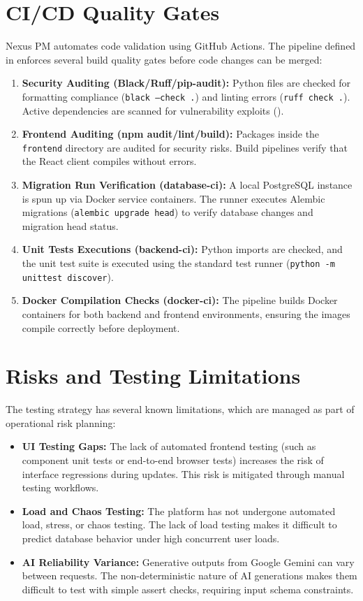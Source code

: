 \section{CI/CD Quality Gates}
Nexus PM automates code validation using GitHub Actions. The pipeline defined in  enforces several build quality gates before code changes can be merged:
\begin{enumerate}
    \item \textbf{Security Auditing (Black/Ruff/pip-audit):} Python files are checked for formatting compliance (\texttt{black --check .}) and linting errors (\texttt{ruff check .}). Active dependencies are scanned for vulnerability exploits ().
    \item \textbf{Frontend Auditing (npm audit/lint/build):} Packages inside the \texttt{frontend} directory are audited for security risks. Build pipelines verify that the React client compiles without errors.
    \item \textbf{Migration Run Verification (database-ci):} A local PostgreSQL instance is spun up via Docker service containers. The runner executes Alembic migrations (\texttt{alembic upgrade head}) to verify database changes and migration head status.
    \item \textbf{Unit Tests Executions (backend-ci):} Python imports are checked, and the unit test suite is executed using the standard test runner (\texttt{python -m unittest discover}).
    \item \textbf{Docker Compilation Checks (docker-ci):} The pipeline builds Docker containers for both backend and frontend environments, ensuring the images compile correctly before deployment.
\end{enumerate}

\section{Risks and Testing Limitations}
The testing strategy has several known limitations, which are managed as part of operational risk planning:
\begin{itemize}
    \item \textbf{UI Testing Gaps:} The lack of automated frontend testing (such as component unit tests or end-to-end browser tests) increases the risk of interface regressions during updates. This risk is mitigated through manual testing workflows.
    \item \textbf{Load and Chaos Testing:} The platform has not undergone automated load, stress, or chaos testing. The lack of load testing makes it difficult to predict database behavior under high concurrent user loads.
    \item \textbf{AI Reliability Variance:} Generative outputs from Google Gemini can vary between requests. The non-deterministic nature of AI generations makes them difficult to test with simple assert checks, requiring input schema constraints.
\end{itemize}

